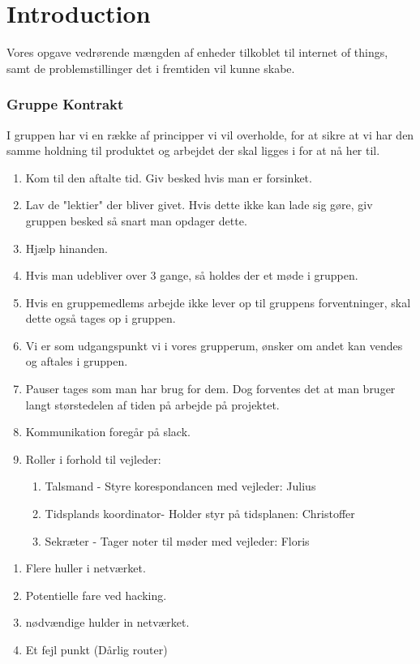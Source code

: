 



\chapter{Introduction}

Vores opgave vedrørende mængden af enheder tilkoblet til internet of things, samt de problemstillinger det i fremtiden vil kunne skabe.



\subsection{Gruppe Kontrakt}
I gruppen har vi en række af principper vi vil overholde, for at sikre at vi har den samme holdning til produktet og arbejdet der skal ligges i for at nå her til.

\begin{enumerate}
	\item Kom til den aftalte tid. Giv besked hvis man er forsinket.
	\item Lav de "lektier" der bliver givet. Hvis dette ikke kan lade sig 		gøre, giv gruppen besked så snart man opdager dette.
	\item Hjælp hinanden.
	\item Hvis man udebliver over 3 gange, så holdes der et møde i gruppen.
	\item Hvis en gruppemedlems arbejde ikke lever op til gruppens forventninger, skal dette også tages op i gruppen.
	\item Vi er som udgangspunkt vi i vores grupperum, ønsker om andet kan vendes og aftales i gruppen.
	\item Pauser tages som man har brug for dem. Dog forventes det at man bruger langt størstedelen af tiden på arbejde på projektet. 
	\item Kommunikation foregår på slack.
	\item Roller i forhold til vejleder:
	\begin{enumerate}
	    \item Talsmand - Styre korespondancen med vejleder: Julius
	    \item Tidsplands koordinator- Holder styr på tidsplanen: Christoffer
	    \item Sekræter - Tager noter til møder med vejleder: Floris
	\end{enumerate}
\end{enumerate}

\newpage






\begin{enumerate}
    \item Flere huller i netværket.
    \item Potentielle fare ved hacking.
    \item nødvændige hulder in netværket.
    \item Et fejl punkt (Dårlig router)
\end{enumerate}







